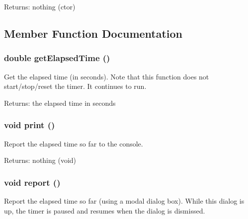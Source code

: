 \begin{Desc}
\item[Returns:]nothing (ctor) \end{Desc}


\subsection{Member Function Documentation}
\subsubsection{\setlength{\rightskip}{0pt plus 5cm}double get\-Elapsed\-Time ()}\label{class_c_s_image_viewer_1_1_timer_9600a3db926153a1297321ce294d39fc}


Get the elapsed time (in seconds). Note that this function does not start/stop/reset the timer. It continues to run. 

\begin{Desc}
\item[Returns:]the elapsed time in seconds \end{Desc}
\subsubsection{\setlength{\rightskip}{0pt plus 5cm}void print ()}\label{class_c_s_image_viewer_1_1_timer_388f572c62279f839ee138a9afbdeeb5}


Report the elapsed time so far to the console. 

\begin{Desc}
\item[Returns:]nothing (void) \end{Desc}
\subsubsection{\setlength{\rightskip}{0pt plus 5cm}void report ()}\label{class_c_s_image_viewer_1_1_timer_e4499ee0125936e10dde278b4a18c289}


Report the elapsed time so far (using a modal dialog box). While this dialog is up, the timer is paused and resumes when the dialog is dismissed. 

